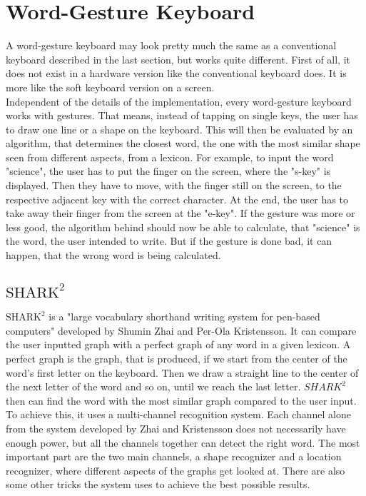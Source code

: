 \section{Word-Gesture Keyboard}
A word-gesture keyboard may look pretty much the same as a conventional keyboard described in the last section, but works quite different. First of all, it does not exist in a hardware version like the conventional keyboard does. It is more like the soft keyboard version on a screen.\\
Independent of the details of the implementation, every word-gesture keyboard works with gestures. That means, instead of tapping on single keys, the user has to draw one line or a shape on the keyboard. This will then be evaluated by an algorithm, that determines the closest word, the one with the most similar shape seen from different aspects, from a lexicon. For example, to input the word "science", the user has to put the finger on the screen, where the "s-key" is displayed. Then they have to move, with the finger still on the screen, to the respective adjacent key with the correct character. At the end, the user has to take away their finger from the screen at the "e-key". If the gesture was more or less good, the algorithm behind should now be able to calculate, that "science" is the word, the user intended to write. But if the gesture is done bad, it can happen, that the wrong word is being calculated. 

\subsection{$\text{SHARK}^2$}
$\text{SHARK}^2$ is a "large vocabulary shorthand writing system for pen-based computers" \cite{Kristensson2004SHARK2AL} developed by Shumin Zhai and Per-Ola Kristensson. It can compare the user inputted graph with a perfect graph of any word in a given lexicon. A perfect graph is the graph, that is produced, if we start from the center of the word's first letter on the keyboard. Then we draw a straight line to the center of the next letter of the word and so on, until we reach the last letter. $SHARK^2$ then can find the word with the most similar graph compared to the user input. To achieve this, it uses a multi-channel recognition system. Each channel alone from the system developed by Zhai and Kristensson \cite{Kristensson2004SHARK2AL} does not necessarily have enough power, but all the channels together can detect the right word. The most important part are the two main channels, a shape recognizer and a location recognizer, where different aspects of the graphs get looked at. There are also some other tricks the system uses to achieve the best possible results.\\
